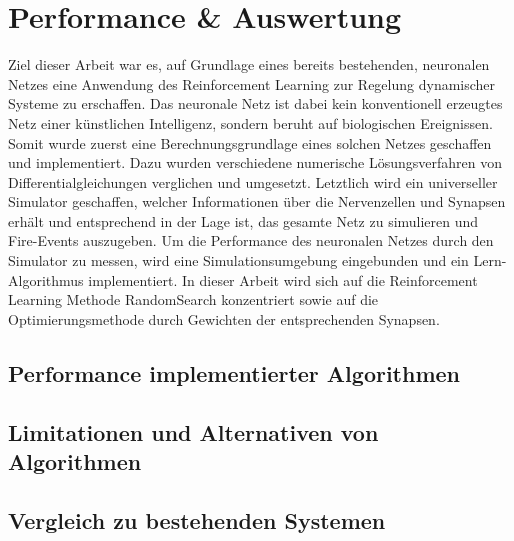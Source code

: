 %
\chapter{Performance \& Auswertung}
\label{chap:erg}
%
	Ziel dieser Arbeit war es, auf Grundlage eines bereits bestehenden, neuronalen Netzes eine Anwendung des Reinforcement Learning zur Regelung dynamischer Systeme zu erschaffen. Das neuronale Netz ist dabei kein konventionell erzeugtes Netz einer künstlichen Intelligenz, sondern beruht auf biologischen Ereignissen.\\
	Somit wurde zuerst eine Berechnungsgrundlage eines solchen Netzes geschaffen und implementiert. Dazu wurden verschiedene numerische Lösungsverfahren von Differentialgleichungen verglichen und umgesetzt. Letztlich wird ein universeller Simulator geschaffen, welcher Informationen über die Nervenzellen und Synapsen erhält und entsprechend in der Lage ist, das gesamte Netz zu simulieren und Fire-Events auszugeben. Um die Performance des neuronalen Netzes durch den Simulator zu messen, wird eine Simulationsumgebung eingebunden und ein Lern-Algorithmus implementiert. In dieser Arbeit wird sich auf die Reinforcement Learning Methode RandomSearch konzentriert sowie auf die Optimierungsmethode durch Gewichten der entsprechenden Synapsen.

\section{Performance implementierter Algorithmen}
\label{sec:erg_performance}
	
	
	
\section{Limitationen und Alternativen von Algorithmen}
\label{sec:erg_lim}

\section{Vergleich zu bestehenden Systemen}
\label{sec:erg_vgl}


